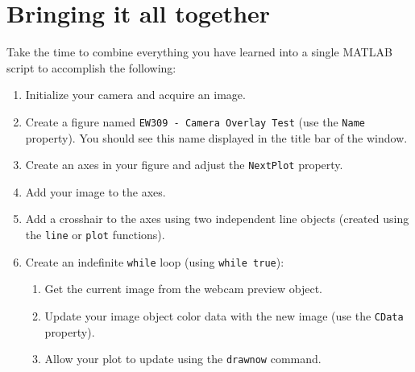 \documentclass{tufte-handout}
\begin{document}
\section{Bringing it all together}
Take the time to combine everything you have learned into a single MATLAB script to accomplish the following:
\begin{enumerate}
\item Initialize your camera and acquire an image.
\item Create a figure named \lstinline{EW309 - Camera Overlay Test} (use the \lstinline{Name} property). You should see this name displayed in the title bar of the window. 
\item Create an axes in your figure and adjust the \lstinline{NextPlot} property.
\item Add your image to the axes.
\item Add a crosshair to the axes using two independent line objects (created using the \lstinline{line} or \lstinline{plot} functions).
\item Create an indefinite \lstinline{while} loop (using \lstinline{while true}):
\begin{enumerate}
\item Get the current image from the webcam preview object.
\item Update your image object color data with the new image (use the \lstinline{CData} property). 
\item Allow your plot to update using the \lstinline{drawnow} command.
\end{enumerate}
\end{enumerate}
\end{document}

